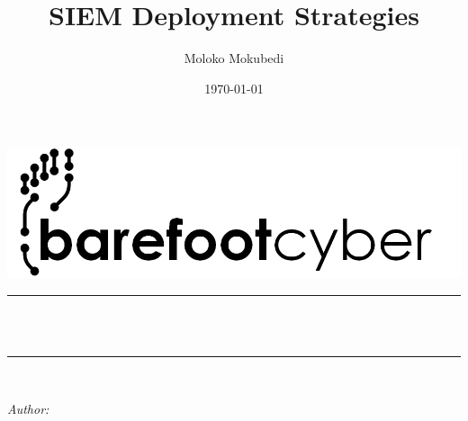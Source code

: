 \documentclass[12pt]{article}
\title{SIEM Deployment Strategies}								%
\author{Moloko Mokubedi}								%
\date{\today}											%
\makeatletter
\let\thetitle\@title
\let\theauthor\@author
\let\thedate\@date
\makeatother
\begin{document}

\begin{titlepage}
	\centering
    \vspace*{0.5 cm}
    \includegraphics[scale = 0.75]{images/BFCLogoLBk.png}\\[1.0 cm]	%
	\rule{\linewidth}{0.2 mm} \\[0.4 cm]
	{ \huge \bfseries \thetitle}\\
	\rule{\linewidth}{0.2 mm} \\[1.5 cm]
	
	\begin{minipage}{0.4\textwidth}
		\begin{center}
			\emph{Author:}\\
			\theauthor
			\end{center}
			\end{minipage}~
			\begin{minipage}{0.4\textwidth}
	\end{minipage}\\[2 cm]
	
	{\large \thedate}\\[2 cm]
 
	\vfill
	
\end{titlepage}


\tableofcontents
\pagebreak
\end{document}
